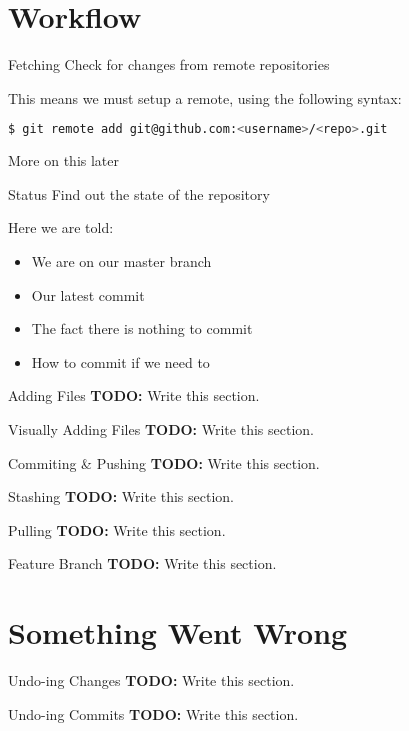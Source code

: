 \documentclass{beamer}
\begin{document}
  \section{Workflow}
  \begin{frame}[fragile=singleslide]{Fetching}
    Check for changes from remote repositories
    
    This means we must setup a remote, using the following syntax:
    \begin{lstlisting}[language=bash]
$ git remote add git@github.com:<username>/<repo>.git
    \end{lstlisting}
    More on this later
  \end{frame}
  \begin{frame}[fragile=singleslide]{Status}
    Find out the state of the repository
    
    Here we are told:
    \begin{itemize}
      \item We are on our master branch
      \item Our latest commit
      \item The fact there is nothing to commit
      \item How to commit if we need to
    \end{itemize}
  \end{frame}
  \begin{frame}{Adding Files}
    \textbf{TODO:} Write this section.
  \end{frame}
  \begin{frame}{Visually Adding Files}
    \textbf{TODO:} Write this section.
  \end{frame}
  \begin{frame}{Commiting \& Pushing}
    \textbf{TODO:} Write this section.
  \end{frame}
  \begin{frame}{Stashing}
    \textbf{TODO:} Write this section.
  \end{frame}
  \begin{frame}{Pulling}
    \textbf{TODO:} Write this section.
  \end{frame}
  \begin{frame}{Feature Branch}
    \textbf{TODO:} Write this section.
  \end{frame}
  \section{Something Went Wrong}
  \begin{frame}{Undo-ing Changes}
    \textbf{TODO:} Write this section.
  \end{frame}
  \begin{frame}{Undo-ing Commits}
    \textbf{TODO:} Write this section.
  \end{frame}
\end{document}

